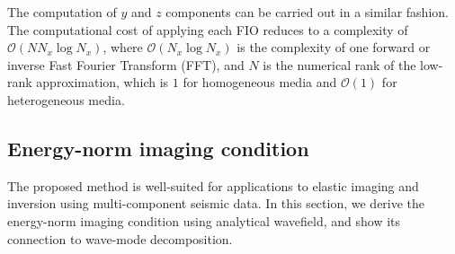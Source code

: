 The computation of $y$ and $z$ components can be carried out in a similar fashion. The computational cost of applying each FIO reduces to a complexity of $\mathcal{O}(N N_x \log N_x)$, where $\mathcal{O}(N_x \log N_x)$ is the complexity of one forward or inverse Fast Fourier Transform (FFT), and $N$ is the numerical rank of the low-rank approximation, which is $1$ for homogeneous media and $\mathcal{O}(1)$ for heterogeneous media.

\subsection{Energy-norm imaging condition}
The proposed method is well-suited for applications to elastic imaging and inversion using multi-component seismic data. In this section, we derive the energy-norm imaging condition using analytical wavefield, and show its connection to wave-mode decomposition.

